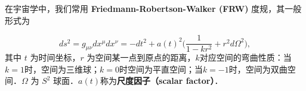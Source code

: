 
在宇宙学中，我们常用 \textbf{Friedmann-Robertson-Walker (FRW)} 度规，其一般形式为

\begin{equation}
ds^2=g_{\mu\nu}dx^{\mu}dx^{\nu}=-dt^2+a(t)^2\Big(\frac{1}{1-kr^2}+r^2 d\Omega^2\Big),
\end{equation}
其中 $t$ 为时间坐标，$r$ 为空间某一点到原点的距离，$k$对应空间的弯曲性质：当$k=1$时，空间为三维球；$k=0$时空间为平直空间；当$k=-1$时，空间为双曲空间．$\Omega$ 为 $S^2$ 球面．$a(t)$称为\textbf{尺度因子（scalar factor）}．
